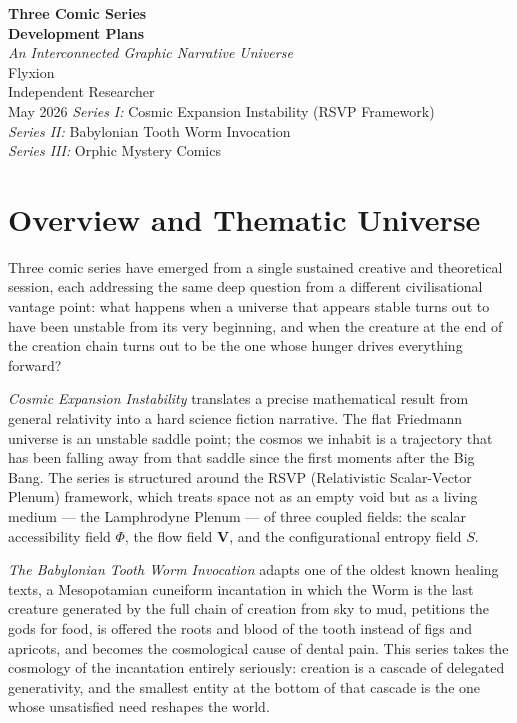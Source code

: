 \documentclass[12pt, a4paper]{article}
\begin{document}
\begin{titlepage}
  \centering
  \vspace*{2cm}
  {\Huge\bfseries Three Comic Series\\[0.4em] Development Plans}\\[1.5em]
  {\large\itshape An Interconnected Graphic Narrative Universe}\\[3em]
  {\large Flyxion}\\[0.5em]
  {\normalsize Independent Researcher}\\[2em]
  {\normalsize May 2026}
  \vfill
  {\small
    \textit{Series I:} Cosmic Expansion Instability (RSVP Framework)\\[0.4em]
    \textit{Series II:} Babylonian Tooth Worm Invocation\\[0.4em]
    \textit{Series III:} Orphic Mystery Comics
  }
\end{titlepage}

\newpage
\tableofcontents
\newpage

\section{Overview and Thematic Universe}

Three comic series have emerged from a single sustained creative and theoretical session, each addressing the same deep question from a different civilisational vantage point: what happens when a universe that appears stable turns out to have been unstable from its very beginning, and when the creature at the end of the creation chain turns out to be the one whose hunger drives everything forward?

\textit{Cosmic Expansion Instability} translates a precise mathematical result from general relativity into a hard science fiction narrative. The flat Friedmann universe is an unstable saddle point; the cosmos we inhabit is a trajectory that has been falling away from that saddle since the first moments after the Big Bang. The series is structured around the RSVP (Relativistic Scalar-Vector Plenum) framework, which treats space not as an empty void but as a living medium --- the Lamphrodyne Plenum --- of three coupled fields: the scalar accessibility field $\Phi$, the flow field $\mathbf{V}$, and the configurational entropy field $S$.

\textit{The Babylonian Tooth Worm Invocation} adapts one of the oldest known healing texts, a Mesopotamian cuneiform incantation in which the Worm is the last creature generated by the full chain of creation from sky to mud, petitions the gods for food, is offered the roots and blood of the tooth instead of figs and apricots, and becomes the cosmological cause of dental pain. This series takes the cosmology of the incantation entirely seriously: creation is a cascade of delegated generativity, and the smallest entity at the bottom of that cascade is the one whose unsatisfied need reshapes the world.
\end{document}
